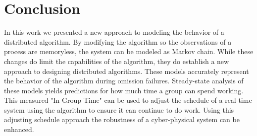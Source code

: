 
\section{Conclusion}

In this work we presented a new approach to modeling the behavior of a distributed algorithm.
By modifying the algorithm so the observations of a process are memoryless, the system can be modeled as Markov chain.
While these changes do limit the capabilities of the algorithm, they do establish a new approach to designing distributed algorithms.
These models accurately represent the behavior of the algorithm during omission failures.
Steady-state analysis of these models yields predictions for how much time a group can spend working.
This measured "In Group Time" can be used to adjust the schedule of a real-time system using the algorithm to ensure it can continue to do work.
Using this adjusting schedule approach the robustness of a cyber-physical system can be enhanced.
